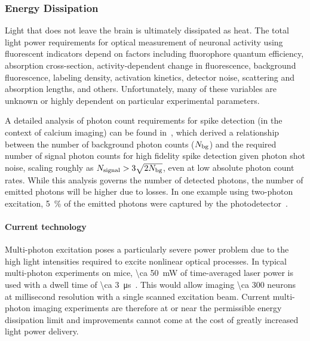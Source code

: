 \subsubsection{Energy Dissipation}

Light that does not leave the brain is ultimately dissipated as heat.
The total light power requirements for optical measurement of neuronal activity using fluorescent indicators depend on factors including
fluorophore quantum efficiency,
absorption cross-section,
activity-dependent change in fluorescence,
background fluorescence,
labeling density,
activation kinetics,
detector noise,
scattering and absorption lengths,
and others. Unfortunately, many of these variables are unknown or highly dependent on particular experimental parameters.

A detailed analysis of photon count requirements for spike detection (in the context of calcium imaging) can be found in~\cite{wilt13}, which derived a relationship between the number of background photon counts ($N_{\text{\scriptsize bg}}$) and the required number of signal photon counts for high fidelity spike detection given photon shot noise, scaling roughly as $N_{\text{\scriptsize signal}} > 3\sqrt{2N_{\text{\scriptsize bg}}}$, even at low absolute photon count rates.
While this analysis governs the number of detected photons, the number of emitted photons will be higher due to losses.
In one example using two-photon excitation, \SI{5}{\percent} of the emitted photons were captured by the photodetector~\cite{kim99}.

\paragraph{Current technology}
Multi-photon excitation poses a particularly severe power problem due to the high light intensities required to excite nonlinear optical processes.
In typical multi-photon experiments on mice, \SI{\ca 50}{\milli\watt} of time-averaged laser power is used with a dwell time of \SI{\ca 3}{\micro\second}~\cite{wilson07}.
This would allow imaging \num{\ca 300} neurons at millisecond resolution with a single scanned excitation beam.
Current multi-photon imaging experiments are therefore at or near the permissible energy dissipation limit and improvements cannot come at the cost of greatly increased light power delivery.

